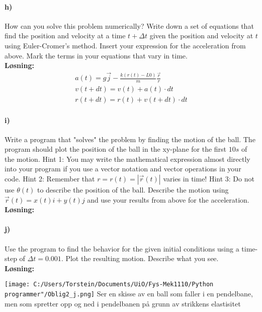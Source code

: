 \documentclass[11pt, A4paper,norsk]{article}
\begin{document}
		\paragraph{h)}
			\begin{flushleft}
How can you solve this problem numerically? Write down a set of equations that find the position and velocity at a time $t + \Delta t$ given the position and velocity at $t$ using Euler-Cromer’s method. Insert your expression for the acceleration from above. Mark the terms in your equations that vary in time. \\
\vspace{1mm}
\textbf{Løsning:} \\
\vspace{1mm}
				\begin{align}
a(t) = g\vec{j} - \frac{k(r(t) - L0)}{m}\frac{\vec{r}}{r} \\
v(t + dt) = v(t) + a(t) \cdot dt \\
r(t + dt) = r(t) + v(t + dt) \cdot dt
				\end{align}
			\end{flushleft}
		\paragraph{i)}
			\begin{flushleft}
Write a program that "solves" the problem by finding the motion of the ball. The program should plot the position of the ball in the xy-plane for the first $10s$ of the motion. Hint 1: You may write the mathematical expression almost directly into your program if you use a vector notation and vector operations in your code. Hint 2: Remember that $r = r(t) = |\vec{r}(t)|$ varies in time! Hint 3: Do not use $\theta(t)$ to describe the position of the ball. Describe the motion using $\vec{r}(t) = x(t)i + y(t)j$ and use your results from above for the acceleration. \\
\vspace{1mm}
\textbf{Løsning:} \\
\vspace{1mm}

				\end{flushleft}
		\paragraph{j)}
			\begin{flushleft}
Use the program to find the behavior for the given initial conditions using a time-step of $\Delta t = 0.001$. Plot the resulting motion. Describe what you see. \\
\vspace{1mm}
\textbf{Løsning:} \\
\vspace{1mm}

\texttt{[image: C:/Users/Torstein/Documents/UiO/Fys-Mek1110/Python programmer"/Oblig2\_j.png]}
Ser en skisse av en ball som faller i en pendelbane, men som spretter opp og ned i pendelbanen på grunn av strikkens elastisitet
			\end{flushleft}
\end{document}
